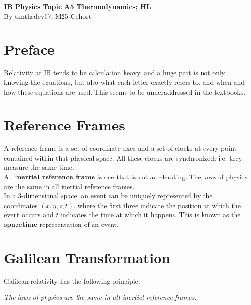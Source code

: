 \documentclass[a4paper,12pt]{article}
\let\oldsection\section
\renewcommand\section{\clearpage\oldsection}
\newcommand{\lb}{\\[8pt]}
\begin{document}
\pagestyle{fancy}


\begin{titlepage}
  \begin{center}

    \vspace*{8cm}
    \textbf{\Large {IB Physics Topic A5 Thermodynamics; HL}} \\
    \vspace*{1cm}
    \large{By timthedev07, M25 Cohort}

  \end{center}
\end{titlepage}


\pagebreak
\section*{Preface}
Relativity at IB tends to be calculation heavy, and a huge part is not only knowing the equations, but also what each letter exactly refers to, and when and how these equations are used. This seems to be underaddressed in the textbooks.
\pagebreak
\tableofcontents
\pagebreak

\clearpage
\setcounter{page}{1}

\section{Reference Frames}

A reference frame is a set of coordinate axes and a set of clocks at every point contained within that physical space. All these clocks are synchronized; i.e. they measure the same time.\lb
An \textbf{inertial reference frame} is one that is not accelerating. The laws of physics are the same in all inertial reference frames. \lb
In a 3-dimensional space, an event can be uniquely represented by the coordinates $(x, y, z, t)$, where the first three indicate the position at which the event occurs and $t$ indicates the time at which it happens. This is known as the \textbf{spacetime} representation of an event.

\section{Galilean Transformation}
Galilean relativity has the following principle:
\begin{center}
  \textit{The laws of physics are the same in all inertial reference frames.}
\end{center}
\end{document}
